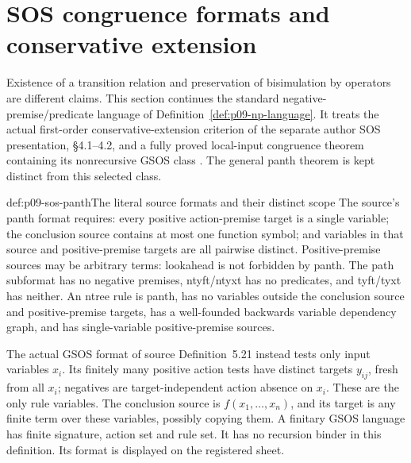 \section{SOS congruence formats and conservative extension}
\label{sec:p09-sos-formats}

Existence of a transition relation and preservation of bisimulation by
operators are different claims. This section continues the standard
negative-premise/predicate language of
Definition~\ref{def:p09-np-language}. It treats the actual first-order
conservative-extension criterion of the separate author SOS presentation,
\S4.1--4.2, and a fully proved local-input congruence theorem containing
its nonrecursive GSOS class \parencite{AcetoFokkinkVerhoefSOSAuthorNP}.
The general panth theorem is kept distinct from this selected class.

\begin{hbdefinition}{def:p09-sos-panth}{The literal source formats and their distinct scope}
The source's panth format requires: every positive action-premise target
is a single variable; the conclusion source contains at most one function
symbol; and variables in that source and positive-premise targets are
all pairwise distinct. Positive-premise sources may be arbitrary terms:
lookahead is not forbidden by panth. The path subformat has no negative
premises, ntyft/ntyxt has no predicates, and tyft/tyxt has neither.
An ntree rule is panth, has no variables outside the conclusion source
and positive-premise targets, has a well-founded backwards variable
dependency graph, and has single-variable positive-premise sources.

The actual GSOS format of source Definition~5.21 instead tests only
input variables \(x_i\). Its finitely many positive action tests have
distinct targets \(y_{ij}\), fresh from all \(x_i\); negatives
are target-independent action absence on \(x_i\). These are the
only rule variables. The conclusion source is
\(f(x_1,\ldots,x_n)\), and its target is any finite term over
these variables, possibly copying them. A finitary GSOS language has
finite signature, action set and rule set. It has no recursion binder
in this definition. Its format is displayed on the registered sheet.
\end{hbdefinition}

